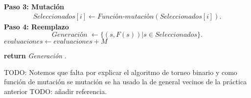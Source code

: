 \begin{algorithm}[H]
\begin{algorithmic}[1]
            \State \textbf{Paso 3:  Mutación}
            \begin{align*}
                Seleccionados[i] \gets \textit{Función-mutación}(Seleccionados[i]).
            \end{align*}
            \EndFor
        \EndWhile
        \State \textbf{Paso 4:  Reemplazo}
        \begin{equation*}
            \textit{Generación } \gets 
            \{
                (s, F(s)) | s \in  Seleccionados
            \}.
        \end{equation*}
        \State $evaluaciones \gets evaluaciones + M$ 

       \State \textbf{return} \textit{Generación }.
    \end{algorithmic}
  \end{algorithm}

TODO: 
  Notemos que falta por explicar el algoritmo de torneo binario 
  y como función de mutación se mutación se ha usado la de general vecinos de la práctica anterior TODO:  añadir referencia. 
